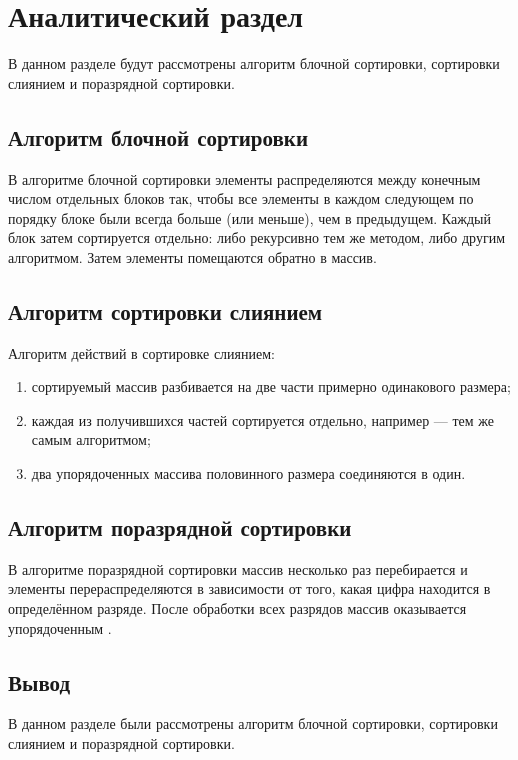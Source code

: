 \chapter{Аналитический раздел}

В данном разделе будут рассмотрены алгоритм блочной сортировки, сортировки слиянием и поразрядной сортировки.

\section{Алгоритм блочной сортировки}

В алгоритме блочной сортировки элементы распределяются между конечным числом отдельных блоков так, чтобы все элементы в каждом следующем по порядку блоке были всегда больше (или меньше), чем в предыдущем. 
Каждый блок затем сортируется отдельно: либо рекурсивно тем же методом, либо другим алгоритмом. Затем элементы помещаются обратно в массив. 

\section{Алгоритм сортировки слиянием}

Алгоритм действий в сортировке слиянием:

\begin{enumerate}[label={\arabic*)}]
	\item сортируемый массив разбивается на две части примерно одинакового размера;
	\item каждая из получившихся частей сортируется отдельно, например — тем же самым алгоритмом;
	\item два упорядоченных массива половинного размера соединяются в один.
\end{enumerate}


\section{Алгоритм поразрядной сортировки}

В алгоритме поразрядной сортировки массив несколько раз перебирается и элементы перераспределяются в зависимости от того, какая цифра находится в определённом разряде. 
После обработки всех разрядов массив оказывается упорядоченным \cite{radix}. 

\section*{Вывод}

В данном разделе были рассмотрены алгоритм блочной сортировки, сортировки слиянием и поразрядной сортировки.
